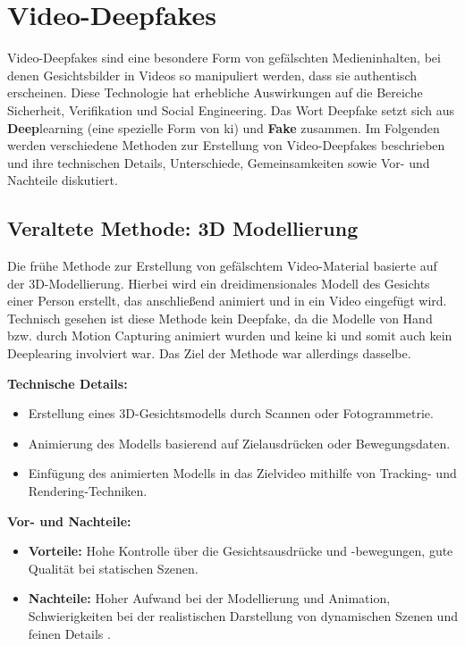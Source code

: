 \section{Video-Deepfakes}\label{sec:video-deepfakes}

Video-Deepfakes sind eine besondere Form von gefälschten Medieninhalten, bei denen Gesichtsbilder in Videos so manipuliert werden, dass sie authentisch erscheinen.
Diese Technologie hat erhebliche Auswirkungen auf die Bereiche Sicherheit, Verifikation und Social Engineering.
Das Wort Deepfake setzt sich aus \textbf{Deep}learning (eine spezielle Form von \gls{ki}) und \textbf{Fake} zusammen.
Im Folgenden werden verschiedene Methoden zur Erstellung von Video-Deepfakes beschrieben und ihre technischen Details, Unterschiede, Gemeinsamkeiten sowie Vor- und Nachteile diskutiert.

\subsection{Veraltete Methode: 3D Modellierung}\label{subsec:3d-modellierung}

Die frühe Methode zur Erstellung von gefälschtem Video-Material basierte auf der 3D-Modellierung.
Hierbei wird ein dreidimensionales Modell des Gesichts einer Person erstellt, das anschließend animiert und in ein Video eingefügt wird.
Technisch gesehen ist diese Methode kein Deepfake, da die Modelle von Hand bzw. durch Motion Capturing animiert wurden und keine \gls{ki} und somit auch kein Deeplearing involviert war.
Das Ziel der Methode war allerdings dasselbe.

\textbf{Technische Details:}
\begin{itemize}
    \item Erstellung eines 3D-Gesichtsmodells durch Scannen oder Fotogrammetrie.
    \item Animierung des Modells basierend auf Zielausdrücken oder Bewegungsdaten.
    \item Einfügung des animierten Modells in das Zielvideo mithilfe von Tracking- und Rendering-Techniken.
\end{itemize}

\textbf{Vor- und Nachteile:}
\begin{itemize}
    \item \textbf{Vorteile:} Hohe Kontrolle über die Gesichtsausdrücke und -bewegungen, gute Qualität bei statischen Szenen.
    \item \textbf{Nachteile:} Hoher Aufwand bei der Modellierung und Animation, Schwierigkeiten bei der realistischen Darstellung von dynamischen Szenen und feinen Details \cite{Deepfakes-An-Overview}.
\end{itemize}

